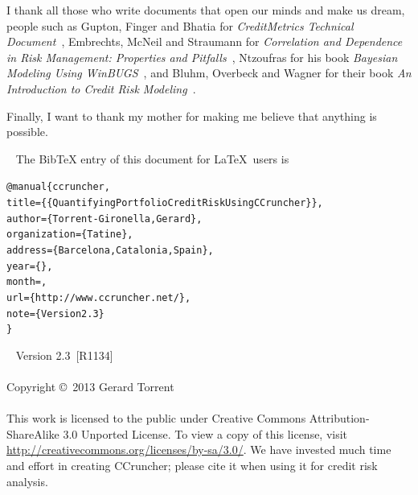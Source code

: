 \documentclass[11pt,fleqn]{book} %
\def\numversion{2.3}
\def\svnversion{R1134}
\begin{document}
I thank all those who write documents that open our minds and make us dream,
people such as Gupton, Finger and Bhatia for \emph{CreditMetrics Technical 
Document}~\cite{cmetrics:1997}, Embrechts, McNeil and Straumann for
\emph{Correlation and Dependence in Risk Management: Properties and 
Pitfalls}~\cite{embrechts:2002}, Ntzoufras for his book \emph{Bayesian Modeling 
Using WinBUGS}~\cite{ntzoufras:2009}, and Bluhm, Overbeck and Wagner for their 
book \emph{An Introduction to Credit Risk Modeling}~\cite{bluhm:2002}.

Finally, I want to thank my mother for making me believe that anything is 
possible.


~\vfill
The BibTeX entry of this document for \LaTeX\ users is
\begin{alltt}
@manual\{ccruncher,
    title = \{\{Quantifying Portfolio Credit Risk Using CCruncher\}\},
    author = \{Torrent-Gironella, Gerard\},
    organization = \{Tatine\},
    address = \{Barcelona, Catalonia, Spain\},
    year = \{\the\year\}, 
    month = \shortmonthname,
    url = \{http://www.ccruncher.net/\},
    note = \{Version \numversion\}
\}
\end{alltt}

~\vfill
\thispagestyle{empty}
\noindent Version \numversion\ [\svnversion]\\ 
\\
\noindent Copyright \copyright\ 2013 Gerard Torrent\\
\\
\noindent 
This work is licensed to the public under Creative Commons 
Attribution-ShareAlike 3.0 Unported License. To view a copy 
of this license, visit 
\url{http://creativecommons.org/licenses/by-sa/3.0/}.
We have invested much time and effort in creating CCruncher; 
please cite it when using it for credit risk analysis.


\pagestyle{empty}
\setcounter{tocdepth}{1}
\tableofcontents
\cleardoublepage
\pagestyle{fancy}
\end{document}
